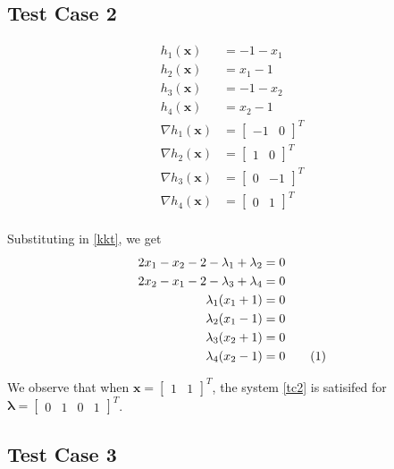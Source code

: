 \documentclass[a4paper]{article}
\newcommand{\numberthis}{\addtocounter{equation}{1}\tag{\theequation}}
\newcommand{\labeleqn}[1]{\numberthis \label{#1}}
\begin{document}
\subsection{Test Case 2}

\begin{align*}
h_1(\textbf{x}) &= -1 - x_1 \\
h_2(\textbf{x}) &= x_1 - 1 \\
h_3(\textbf{x}) &= -1 - x_2 \\
h_4(\textbf{x}) &= x_2 - 1 \\
\nabla h_1(\textbf{x}) &= \begin{bmatrix} -1 & 0 \end{bmatrix} ^T \\
\nabla h_2(\textbf{x}) &= \begin{bmatrix} 1 & 0 \end{bmatrix} ^T \\
\nabla h_3(\textbf{x}) &= \begin{bmatrix} 0 & -1 \end{bmatrix} ^T \\
\nabla h_4(\textbf{x}) &= \begin{bmatrix} 0 & 1 \end{bmatrix} ^T \\
\end{align*}

Substituting in \eqref{kkt}, we get
\begin{align*}
2 x_1 - x_2 - 2 - \lambda_1 + \lambda_2 &= 0 \\
2 x_2 - x_1 - 2 - \lambda_3 + \lambda_4 &= 0 \\
\lambda_1 (x_1 + 1) &= 0 \\
\lambda_2 (x_1 - 1) &= 0 \\
\lambda_3 (x_2 + 1) &= 0 \\
\lambda_4 (x_2 - 1) &= 0 \labeleqn{tc2}
\end{align*}

We observe that when $\textbf{x} = \begin{bmatrix} 1 & 1 \end{bmatrix} ^T$, the system \eqref{tc2} is satisifed for $\boldsymbol{\lambda} = \begin{bmatrix} 0 & 1 & 0 & 1 \end{bmatrix} ^T$.

\subsection{Test Case 3}
\end{document}
